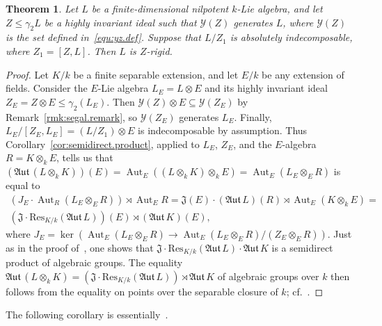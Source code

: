 \documentclass[11pt,a4paper]{amsart}
\theoremstyle{plain}
\newtheorem{thm}{Theorem}[section]
\theoremstyle{remark}
\newcommand{\tensor}{\otimes}
\DeclareMathOperator{\Aut}{Aut}
\def \aAut {\mathfrak{Aut} \,}
\begin{document}
\begin{thm} \label{thm:rigidity}
Let $L$ be a finite-dimensional nilpotent $k$-Lie algebra, and let ${Z} \leq \gamma_2 {L}$ be a highly invariant ideal such that $\mathcal{Y}(Z)$ generates $L$, where $\mathcal{Y}(Z)$ is the set defined in~\eqref{equ:yz.def}.  Suppose that ${L} / Z_1$ is {absolutely indecomposable}, where $Z_1 = [Z,L]$.  Then $L$ is $Z$-rigid.
\end{thm}
\begin{proof}
Let $K / k$ be a finite separable extension, and let $E/k$ be any extension of fields.  Consider the $E$-Lie algebra ${L}_E = L  \tensor E$ and its highly invariant ideal ${Z}_E = Z \tensor E \leq \gamma_2 (L_E)$.  Then $\mathcal{Y}(Z) \tensor E \subseteq \mathcal{Y}(Z_E)$ by Remark~\ref{rmk:segal.remark}, so $\mathcal{Y}({Z}_E)$ generates ${L}_E$.  Finally, ${L}_E/[{Z}_E,{L}_E] = (L / Z_1) \tensor E$ is indecomposable by assumption.  Thus Corollary~\ref{cor:semidirect.product}, applied to ${L}_E$, ${Z}_E$, and the $E$-algebra $R = K \tensor_k E$, tells us that $ (\aAut (L \tensor_k K))(E) =  \Aut_E ((L \tensor_k K) \tensor_k E) = \Aut_E ({L}_E \tensor_E R)$ is equal to
\begin{multline*}
 (J_E \cdot \Aut_R(L_E \tensor_E R)) \rtimes \Aut_E R = \mathfrak{J}(E) \cdot (\aAut L)(R) \rtimes \Aut_E (K \tensor_k E) = \\
 (\mathfrak{J} \cdot \mathrm{Res}_{K/k} (\aAut L))(E) \rtimes (\aAut K)(E),
\end{multline*}
where $J_E = \ker (\Aut_E (L_E \tensor_E R) \to \Aut_E (L_E \tensor_E R)/(Z_E \tensor_E R))$.  Just as in the proof of~\cite[Theorem~2]{Segal/89}, one shows that $\mathfrak{J} \cdot \mathrm{Res}_{K/k}(\aAut L) \cdot \aAut K$ is a semidirect product of algebraic groups.  The equality $\aAut (L \tensor_k K) = (\mathfrak{J} \cdot \mathrm{Res}_{K/k} (\aAut L)) \rtimes \aAut K$ of algebraic groups over $k$ then follows from the equality on points over the separable closure of $k$; cf.~\cite[Corollary~1.30]{Milne/17}.
\end{proof}

The following corollary is essentially~\cite[Theorem~2]{Segal/89}.
\end{document}
